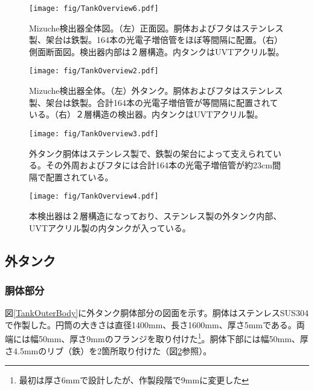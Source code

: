 \documentclass[11pt]{ltjsreport}
\newcommand{\figref}[1]{図\ref{#1}}
\begin{document}
\begin{figure}[htbp]
\centering
\texttt{[image: fig/TankOverview6.pdf]}
\caption[Mizuche検出器全体図]{Mizuche検出器全体図。（左）正面図。胴体およびフタはステンレス製、架台は鉄製。164本の光電子増倍管をほぼ等間隔に配置。（右）側面断面図。検出器内部は２層構造。内タンクはUVTアクリル製。}
\label{TankOverview}
\end{figure}

\begin{figure}[htbp]
\centering
\texttt{[image: fig/TankOverview2.pdf]}
\caption[Mizuche検出器全体]{Mizuche検出器全体。（左）外タンク。胴体およびフタはステンレス製、架台は鉄製。合計164本の光電子増倍管が等間隔に配置されている。（右）２層構造の検出器。内タンクはUVTアクリル製。}
\label{TankOverview}
\end{figure}
\fi%


\begin{figure}[htbp]
\begin{minipage}{0.47\textwidth}
\centering
\texttt{[image: fig/TankOverview3.pdf]}
\caption[Mizuche検出器の外観]{外タンク胴体はステンレス製で、鉄製の架台によって支えられている。その外周およびフタには合計164本の光電子増倍管が約23cm間隔で配置されている。}
\label{fig:one}
\end{minipage}
\hfil
\begin{minipage}{0.47\textwidth}
\centering
\texttt{[image: fig/TankOverview4.pdf]}
\caption[Mizuche検出器の外観（フタを取った状態）]{本検出器は２層構造になっており、ステンレス製の外タンク内部、UVTアクリル製の内タンクが入っている。}
\label{fig:two}
\end{minipage}
\end{figure}
\fi%

\subsection{外タンク}

\subsubsection{胴体部分}

\figref{TankOuterBody}に外タンク胴体部分の図面を示す。胴体はステンレスSUS304で作製した。円筒の大きさは直径1400mm、長さ1600mm、厚さ5mmである。両端には幅50mm、厚さ9mmのフランジを取り付けた\footnote{最初は厚さ6mmで設計したが、作製段階で9mmに変更した}。胴体下部には幅50mm、厚さ4.5mmのリブ（鉄）を2箇所取り付けた（\figref{TankOverview}参照）。
\end{document}
